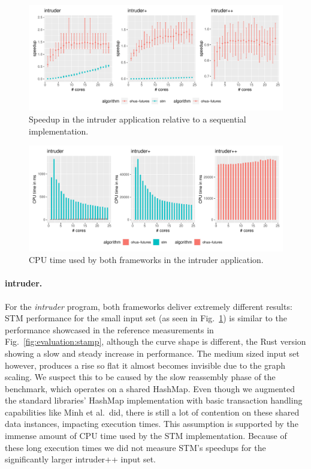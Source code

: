 \begin{figure}
    \centering
    \includegraphics[width=\textwidth,keepaspectratio]{gfx/results/intruder_comb}
    \caption{Speedup in the intruder application relative to a sequential implementation.}%
    \label{fig:evaluation:intruder}
\end{figure}

\begin{figure}
    \centering
    \includegraphics[width=\textwidth,keepaspectratio]{gfx/results/cpu_intruder_comb}
    \caption{CPU time used by both frameworks in the intruder application.}%
    \label{fig:evaluation:intruder-cpu}
\end{figure}

\paragraph{intruder.} For the \emph{intruder} program, both frameworks deliver extremely different results:
STM performance for the small input set (as seen in Fig.~\ref{fig:evaluation:intruder}) is similar to the performance showcased in the reference measurements in Fig.~\ref{fig:evaluation:stamp}, although the curve shape is different, the Rust version showing a slow and steady increase in performance.
The medium sized input set however, produces a rise so flat it almost becomes invisible due to the graph scaling.
We suspect this to be caused by the slow reassembly phase of the benchmark, which operates on a shared HashMap.
Even though we augmented the standard libraries' HashMap implementation with basic transaction handling capabilities like Minh et al.\ did, there is still a lot of contention on these shared data instances, impacting execution times.
This assumption is supported by the immense amount of CPU time used by the STM implementation.
Because of these long execution times we did not measure STM's speedups for the significantly larger intruder++ input set.


